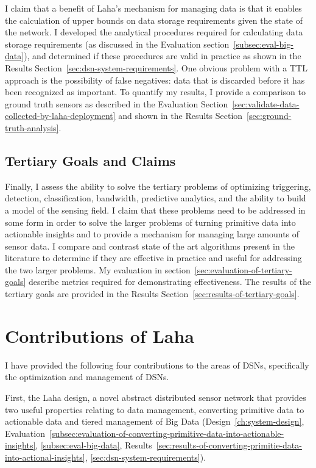 I claim that a benefit of Laha's mechanism for managing data is that it enables the calculation of upper bounds on data storage requirements given the state of the network. I developed the analytical procedures required for calculating data storage requirements (as discussed in the Evaluation section~\ref{subsec:eval-big-data}), and determined if these procedures are valid in practice as shown in the Results Section~\ref{sec:dsn-system-requirements}. One obvious problem with a TTL approach is the possibility of false negatives: data that is discarded before it has been recognized as important. To quantify my results, I provide a comparison to ground truth sensors as described in the Evaluation Section~\ref{sec:validate-data-collected-by-laha-deployment} and shown in the Results Section~\ref{sec:ground-truth-analysis}.

\subsection{Tertiary Goals and Claims}\label{subsec:tertiary-goals-and-claims}
Finally, I assess the ability to solve the tertiary problems of optimizing triggering, detection, classification, bandwidth, predictive analytics, and the ability to build a model of the sensing field. I claim that these problems need to be addressed in some form in order to solve the larger problems of turning primitive data into actionable insights and to provide a mechanism for managing large amounts of sensor data. I compare and contrast state of the art algorithms present in the literature to determine if they are effective in practice and useful for addressing the two larger problems. My evaluation in section~\ref{sec:evaluation-of-tertiary-goals} describe metrics required for demonstrating effectiveness. The results of the tertiary goals are provided in the Results Section~\ref{sec:results-of-tertiary-goals}.

\section{Contributions of Laha}\label{subsec:anticipated-contributions}
I have provided the following four contributions to the areas of DSNs, specifically the optimization and management of DSNs.

First, the Laha design, a novel abstract distributed sensor network that provides two useful properties relating to data management, converting primitive data to actionable data and tiered management of Big Data (Design~\ref{ch:system-design}, Evaluation~\ref{subsec:evaluation-of-converting-primitive-data-into-actionable-insights}, \ref{subsec:eval-big-data}, Results~\ref{sec:results-of-converting-primitie-data-into-actional-insights}, \ref{sec:dsn-system-requirements}).

